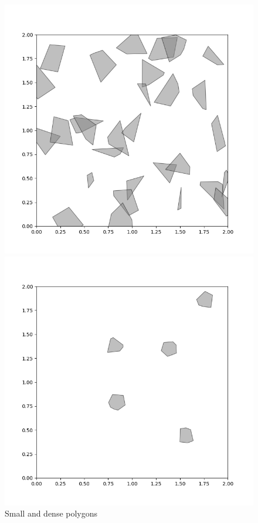 \documentclass{article}
\begin{document}
\begin{figure}[htbp]
\begin{minipage}{0.45\textwidth}
    \includegraphics[width=\linewidth]{part1_small_dense.png}
    \caption{Small and dense polygons}
  \end{minipage}
  \begin{minipage}{0.45\textwidth}
    \includegraphics[width=\linewidth]{part1_small_sparse.png}

\end{minipage}
\end{figure}
\end{document}
